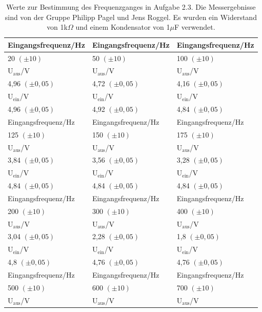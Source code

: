 \documentclass[12pt]{scrartcl}
\begin{document}
\begin{table}[H]
\caption{Werte zur Bestimmung des Frequenzganges in Aufgabe 2.3. Die Messergebnisse sind von der Gruppe Philipp Pagel und Jens Roggel. Es wurden ein Widerstand von 1k$\Omega$ und einem Kondensator von 1$\mu$F verwendet.}
\begin{center}
\begin{tabular}{|l|l|l|}
\hline
Eingangsfrequenz/Hz & Eingangsfrequenz/Hz & Eingangsfrequenz/Hz \\ \hline
20 $(\pm 10)$ & 50 $(\pm 10)$ & 100 $(\pm 10)$ \\ \hline
U$_\text{aus}$/V & U$_\text{aus}$/V & U$_\text{aus}$/V \\ \hline
4,96 $(\pm 0,05)$ & 4,72 $(\pm 0,05)$ & 4,16 $(\pm 0,05)$ \\ \hline
U$_\text{ein}$/V & U$_\text{ein}$/V & U$_\text{ein}$/V \\ \hline
4,96 $(\pm 0,05)$ & 4,92 $(\pm 0,05)$ & 4,84 $(\pm 0,05)$ \\ \hline \hline
Eingangsfrequenz/Hz & Eingangsfrequenz/Hz & Eingangsfrequenz/Hz \\ \hline
125 $(\pm 10)$ & 150 $(\pm 10)$ & 175 $(\pm 10)$ \\ \hline
U$_\text{aus}$/V & U$_\text{aus}$/V & U$_\text{aus}$/V \\ \hline
3,84 $(\pm 0,05)$ & 3,56 $(\pm 0,05)$ & 3,28 $(\pm 0,05)$ \\ \hline
U$_\text{ein}$/V & U$_\text{ein}$/V & U$_\text{ein}$/V \\ \hline
4,84 $(\pm 0,05)$ & 4,84 $(\pm 0,05)$ & 4,84 $(\pm 0,05)$ \\ \hline \hline
Eingangsfrequenz/Hz & Eingangsfrequenz/Hz & Eingangsfrequenz/Hz \\ \hline 
200 $(\pm 10)$ & 300 $(\pm 10)$ & 400 $(\pm 10)$ \\ \hline
U$_\text{aus}$/V & U$_\text{aus}$/V & U$_\text{aus}$/V \\ \hline
3,04 $(\pm 0,05)$ & 2,28 $(\pm 0,05)$ & 1,8 $(\pm 0,05)$ \\ \hline
U$_\text{ein}$/V & U$_\text{ein}$/V & U$_\text{ein}$/V \\ \hline
4,8 $(\pm 0,05)$ & 4,76 $(\pm 0,05)$ & 4,76 $(\pm 0,05)$ \\ \hline \hline
Eingangsfrequenz/Hz & Eingangsfrequenz/Hz & Eingangsfrequenz/Hz \\ \hline
500 $(\pm 10)$ & 600 $(\pm 10)$ & 700 $(\pm 10)$ \\ \hline
U$_\text{aus}$/V & U$_\text{aus}$/V & U$_\text{aus}$/V \\ \hline

\end{tabular}
\end{center}
\end{table}
\end{document}
